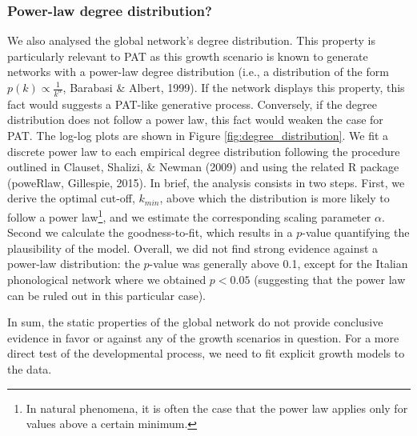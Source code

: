 \documentclass[10pt, letterpaper]{article}
\begin{document}
\subsubsection{Power-law degree
distribution?}\label{power-law-degree-distribution}

We also analysed the global network's degree distribution. This property
is particularly relevant to PAT as this growth scenario is known to
generate networks with a power-law degree distribution (i.e., a
distribution of the form \(p(k) \propto \frac{1}{k^{\alpha}}\), Barabasi
\& Albert, 1999). If the network displays this property, this fact would
suggests a PAT-like generative process. Conversely, if the degree
distribution does not follow a power law, this fact would weaken the
case for PAT. The log-log plots are shown in Figure
\ref{fig:degree_distribution}. We fit a discrete power law to each
empirical degree distribution following the procedure outlined in
Clauset, Shalizi, \& Newman (2009) and using the related R package
(poweRlaw, Gillespie, 2015). In brief, the analysis consists in two
steps. First, we derive the optimal cut-off, \(k_{min}\), above which
the distribution is more likely to follow a power
law\footnote{In natural phenomena, it is often the case that the power law applies only for values above a certain minimum.},
and we estimate the corresponding scaling parameter \(\alpha\). Second
we calculate the goodness-to-fit, which results in a \(p\)-value
quantifying the plausibility of the model. Overall, we did not find
strong evidence against a power-law distribution: the \(p\)-value was
generally above 0.1, except for the Italian phonological network where
we obtained \(p < 0.05\) (suggesting that the power law can be ruled out
in this particular case).

In sum, the static properties of the global network do not provide
conclusive evidence in favor or against any of the growth scenarios in
question. For a more direct test of the developmental process, we need
to fit explicit growth models to the data.
\end{document}
